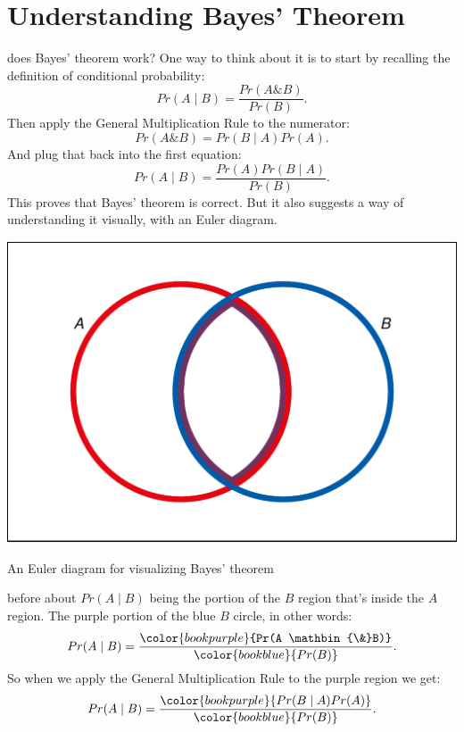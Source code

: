\documentclass[justified]{tufte-book}
\newcommand{\given}{\mid}
\renewcommand{\wedge}{\mathbin{\&}}
\newcommand{\p}{Pr}
\theoremstyle{definition}
\theoremstyle{definition}
\theoremstyle{definition}
\theoremstyle{remark}
\begin{document}
\hypertarget{understanding-bayes-theorem}{%
\section{Understanding Bayes'
Theorem}\label{understanding-bayes-theorem}}

 does Bayes' theorem work? One way to think about it is
to start by recalling the definition of conditional probability:
\[ \p(A \given B) = \frac{\p(A \wedge B)}{\p(B)}. \] Then apply the
General Multiplication Rule to the numerator:
\[ \p(A \wedge B) = \p(B \given A)\p(A).\] And plug that back into the
first equation:
\[ \p(A \given B) = \frac{\p(A) \p(B \given A)}{\p(B)}. \] This proves
that Bayes' theorem is correct. But it also suggests a way of
understanding it visually, with an Euler diagram.

\begin{marginfigure}
\includegraphics{_main_files/figure-latex/unnamed-chunk-79-1} \caption[An Euler diagram for visualizing Bayes' theorem]{An Euler diagram for visualizing Bayes' theorem}\label{fig:unnamed-chunk-79}
\end{marginfigure}

 before about \(\p(A \given B)\) being the
portion of the \(B\) region that's inside the \(A\) region. The purple
portion of the blue \(B\) circle, in other words: \[
  \begin{aligned}
    \p(A \given B) &= \frac{ \color{bookpurple}{\p(A \wedge B)} }{ \color{bookblue}{\p(B)} }.\\
  \end{aligned}
\] So when we apply the General Multiplication Rule to the purple region
we get: \[
  \begin{aligned}
    \p(A \given B) &= \frac{ \color{bookpurple}{\p(B \given A)\p(A)} }{ \color{bookblue}{\p(B)} }.\\
  \end{aligned}
\]
\end{document}
